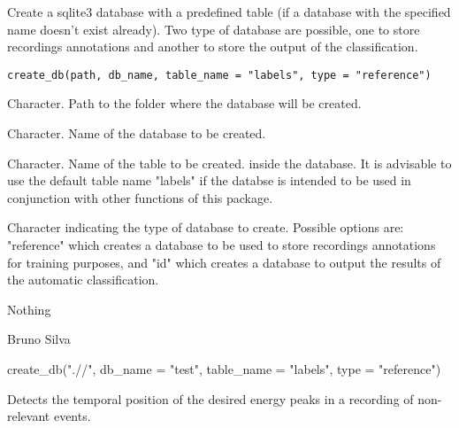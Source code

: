 \documentclass[letterpaper]{book}
\begin{document}
%
\begin{Description}\relax
Create a sqlite3 database with a predefined table (if a
database with the specified name doesn't exist already). Two type of database
are possible, one to store recordings annotations and another to store
the output of the classification.
\end{Description}
%
\begin{Usage}
\begin{verbatim}
create_db(path, db_name, table_name = "labels", type = "reference")
\end{verbatim}
\end{Usage}
%
\begin{Arguments}
\begin{ldescription}
\item[\code{path}] Character. Path to the folder where the database will be created.

\item[\code{db\_name}] Character. Name of the database to be created.

\item[\code{table\_name}] Character. Name of the table to be created.
inside the database. It is advisable to use the default table name "labels"
if the databse is intended to be used in conjunction with other functions of
this package.

\item[\code{type}] Character indicating the type of database to create. Possible
options are: "reference" which creates a database to be used to store
recordings annotations for training purposes, and "id" which
creates a database to output the results of the automatic classification.
\end{ldescription}
\end{Arguments}
%
\begin{Value}
Nothing
\end{Value}
%
\begin{Author}\relax
Bruno Silva
\end{Author}
%
\begin{Examples}
\begin{ExampleCode}
create_db(".//", db_name = "test", table_name = "labels", 
type = "reference")
\end{ExampleCode}
\end{Examples}
%
\begin{Description}\relax
Detects the temporal position of the desired energy peaks in
a recording of non-relevant events.
\end{Description}
\end{document}
